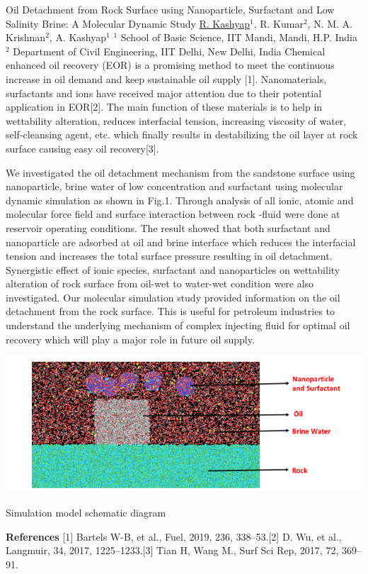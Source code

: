 
    \begin{abstract_online}{Oil Detachment from Rock Surface using Nanoparticle, Surfactant and Low Salinity Brine: A Molecular Dynamic Study}{%
        \underline{R. Kashyap}$^{1}$, R. Kumar$^{2}$, N. M. A. Krishnan$^{2}$, A. Kashyap$^{1}$}{%
        }{%
        $^1$ School of Basic Science, IIT Mandi, Mandi, H.P. India \newline{}$^2$  Department of Civil Engineering, IIT Delhi, New Delhi, India }
    Chemical enhanced oil recovery (EOR) is a promising method to meet the continuous increase in oil demand and keep sustainable oil supply [1]. Nanomaterials, surfactants and ions have received major attention due to their potential application in EOR[2]. The main function of these materials is to help in wettability alteration, reduces interfacial tension, increasing viscosity of water, self-cleansing agent, etc. which finally results in destabilizing the oil layer at rock surface causing easy oil recovery[3]. \par  We investigated the oil detachment mechanism from the sandstone surface using nanoparticle, brine water of low concentration and surfactant using molecular dynamic simulation as shown in Fig.1. Through analysis of all ionic, atomic and molecular force field and surface interaction between rock -fluid  were done at reservoir operating conditions. The result showed that both surfactant and nanoparticle are adsorbed at oil and brine interface which reduces the interfacial tension and increases the total surface pressure resulting in oil detachment. Synergistic effect of ionic species, surfactant and nanoparticles on wettability alteration of rock surface from oil-wet to water-wet condition were also investigated. Our molecular simulation study provided information on the oil detachment from the rock surface. This is useful for petroleum industries to understand the underlying mechanism of complex injecting fluid for optimal oil recovery which will play a major role in future oil supply. \begin{center}  \includegraphics[width=\linewidth]{abstracts/txt/figures/rajneesh.png}  \caption{Simulation model schematic diagram}  \end{center}  
    
        \textbf{References} \newline{}[1] Bartels W-B, et al., Fuel, 2019, 236, 338–53.\newline{}[2] D. Wu, et al., Langmuir, 34, 2017, 1225–1233.\newline{}[3] Tian H, Wang M., Surf Sci Rep, 2017, 72, 369–91.
    \end{abstract_online}
    